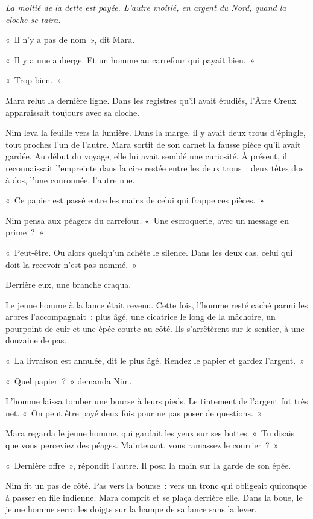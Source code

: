 \documentclass[10pt,a4paper]{article}
\begin{document}
\emph{La moitié de la dette est payée. L’autre moitié, en argent du Nord, quand la cloche se taira.}

«~Il n’y a pas de nom~», dit Mara.

«~Il y a une auberge. Et un homme au carrefour qui payait bien.~»

«~Trop bien.~»

Mara relut la dernière ligne. Dans les registres qu’il avait étudiés, l’Âtre Creux apparaissait toujours avec sa cloche.

Nim leva la feuille vers la lumière. Dans la marge, il y avait deux trous d’épingle, tout proches l’un de l’autre. Mara sortit de son carnet la fausse pièce qu’il avait gardée. Au début du voyage, elle lui avait semblé une curiosité. À présent, il reconnaissait l’empreinte dans la cire restée entre les deux trous~: deux têtes dos à dos, l’une couronnée, l’autre nue.

«~Ce papier est passé entre les mains de celui qui frappe ces pièces.~»

Nim pensa aux péagers du carrefour. «~Une escroquerie, avec un message en prime~?~»

«~Peut-être. Ou alors quelqu’un achète le silence. Dans les deux cas, celui qui doit la recevoir n’est pas nommé.~»

Derrière eux, une branche craqua.

Le jeune homme à la lance était revenu. Cette fois, l’homme resté caché parmi les arbres l’accompagnait~: plus âgé, une cicatrice le long de la mâchoire, un pourpoint de cuir et une épée courte au côté. Ils s’arrêtèrent sur le sentier, à une douzaine de pas.

«~La livraison est annulée, dit le plus âgé. Rendez le papier et gardez l’argent.~»

«~Quel papier~?~» demanda Nim.

L’homme laissa tomber une bourse à leurs pieds. Le tintement de l’argent fut très net. «~On peut être payé deux fois pour ne pas poser de questions.~»

Mara regarda le jeune homme, qui gardait les yeux sur ses bottes. «~Tu disais que vous perceviez des péages. Maintenant, vous ramassez le courrier~?~»

«~Dernière offre~», répondit l’autre. Il posa la main sur la garde de son épée.

Nim fit un pas de côté. Pas vers la bourse~: vers un tronc qui obligeait quiconque à passer en file indienne. Mara comprit et se plaça derrière elle. Dans la boue, le jeune homme serra les doigts sur la hampe de sa lance sans la lever.
\end{document}
